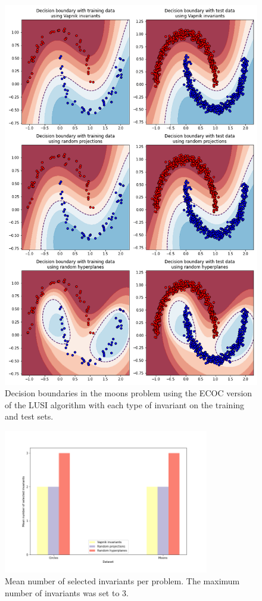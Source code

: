 \begin{figure}[h]
    \centering
    \includegraphics[width=\textwidth]{thesis/Figures/moons_decision_boundaries_ecoc.png}
    \caption{Decision boundaries in the moons problem using the ECOC version of the LUSI algorithm with each type
    of invariant on the training and test sets.}
    \label{fig:moons_decision_boundary_ecoc}
\end{figure}

\begin{figure}[H]
    \centering
    \includegraphics[width=0.8\textwidth]{thesis/Figures/num_selected_invariants.png}
    \caption{Mean number of selected invariants per problem. The maximum number of invariants was set to 3.}
    \label{fig:toys_small_num_selected_invariants}
\end{figure}

